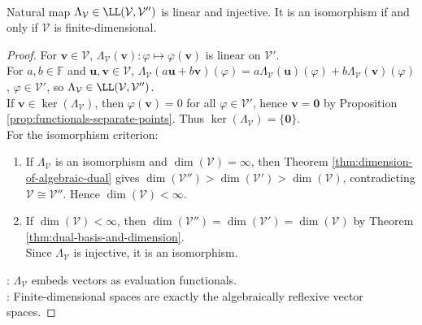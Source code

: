 \begin{theorem} \label{thm:algebraic-reflexivity-natural-map} \\
Natural map $\Lambda_{\mathcal{V}}\in\LL(\mathcal{V},\mathcal{V}'')$ is linear and injective. It is an isomorphism if and only if $\mathcal{V}$ is finite-dimensional.
\begin{proof}
For $\mathbf{v}\in\mathcal{V}$, $\Lambda_{\mathcal{V}}(\mathbf{v}):\varphi\mapsto\varphi(\mathbf{v})$ is linear on $\mathcal{V}'$.\\
For $a,b\in\mathbb{F}$ and $\mathbf{u},\mathbf{v}\in\mathcal{V}$, $\Lambda_{\mathcal{V}}(a\mathbf{u}+b\mathbf{v})(\varphi) =a\Lambda_{\mathcal{V}}(\mathbf{u})(\varphi)+b\Lambda_{\mathcal{V}}(\mathbf{v})(\varphi)$, $\varphi\in\mathcal{V}'$, so $\Lambda_{\mathcal{V}}\in\LL(\mathcal{V},\mathcal{V}'')$.\\
If $\mathbf{v}\in\ker(\Lambda_{\mathcal{V}})$, then $\varphi(\mathbf{v})=0$ for all $\varphi\in\mathcal{V}'$, hence $\mathbf{v}=\mathbf{0}$ by Proposition \ref{prop:functionals-separate-points}. Thus $\ker(\Lambda_{\mathcal{V}})=\{\mathbf{0}\}$.\\
For the isomorphism criterion:
\begin{enumerate}[label=\roman*.]
\setlength{\itemsep}{0pt}
\item[$(\Rightarrow)$] If $\Lambda_{\mathcal{V}}$ is an isomorphism and $\dim(\mathcal{V})=\infty$, then Theorem \ref{thm:dimension-of-algebraic-dual} gives $\dim(\mathcal{V}'')>\dim(\mathcal{V}')>\dim(\mathcal{V})$, contradicting $\mathcal{V}\cong\mathcal{V}''$. Hence $\dim(\mathcal{V})<\infty$.
\item[$(\Leftarrow)$] If $\dim(\mathcal{V})<\infty$, then $\dim(\mathcal{V}'')=\dim(\mathcal{V}')=\dim(\mathcal{V})$ by Theorem \ref{thm:dual-basis-and-dimension}.\\
Since $\Lambda_{\mathcal{V}}$ is injective, it is an isomorphism.
\end{enumerate}
: $\Lambda_{\mathcal{V}}$ embeds vectors as evaluation functionals.\\
: Finite-dimensional spaces are exactly the algebraically reflexive vector spaces.
\end{proof}
\end{theorem}

